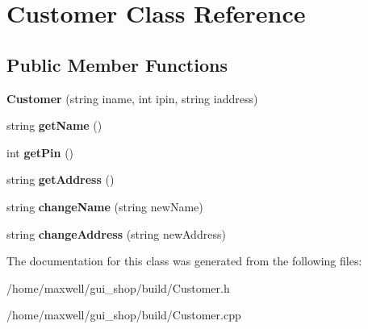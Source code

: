\hypertarget{classCustomer}{}\section{Customer Class Reference}
\label{classCustomer}
\subsection*{Public Member Functions}
\begin{DoxyCompactItemize}
\item 
{\bfseries Customer} (string iname, int ipin, string iaddress)\hypertarget{classCustomer_ad0ee1a51693f5fae745ea9f870a963d0}{}\label{classCustomer_ad0ee1a51693f5fae745ea9f870a963d0}

\item 
string {\bfseries get\+Name} ()\hypertarget{classCustomer_a1bda0c5a9b2f4bf0c3314832e95f2566}{}\label{classCustomer_a1bda0c5a9b2f4bf0c3314832e95f2566}

\item 
int {\bfseries get\+Pin} ()\hypertarget{classCustomer_a65c77b6d5826427aef7138f663ca21a5}{}\label{classCustomer_a65c77b6d5826427aef7138f663ca21a5}

\item 
string {\bfseries get\+Address} ()\hypertarget{classCustomer_aebd5a3862a90a21ec56198a69dbe7f34}{}\label{classCustomer_aebd5a3862a90a21ec56198a69dbe7f34}

\item 
string {\bfseries change\+Name} (string new\+Name)\hypertarget{classCustomer_a6ef497d79b565e479a7807dad7027ecc}{}\label{classCustomer_a6ef497d79b565e479a7807dad7027ecc}

\item 
string {\bfseries change\+Address} (string new\+Address)\hypertarget{classCustomer_a4eeaf4fadbd450526054ad94cccf52ad}{}\label{classCustomer_a4eeaf4fadbd450526054ad94cccf52ad}

\end{DoxyCompactItemize}


The documentation for this class was generated from the following files\+:\begin{DoxyCompactItemize}
\item 
/home/maxwell/gui\+\_\+shop/build/Customer.\+h\item 
/home/maxwell/gui\+\_\+shop/build/Customer.\+cpp\end{DoxyCompactItemize}
